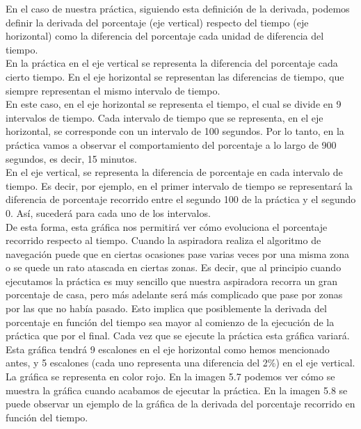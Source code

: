 En el caso de nuestra práctica, siguiendo esta definición de la derivada, podemos definir la derivada del porcentaje (eje vertical) respecto del tiempo (eje horizontal) como la diferencia del porcentaje cada unidad de diferencia del tiempo.\\

En la práctica en el eje vertical se representa la diferencia del porcentaje cada cierto tiempo. En el eje horizontal se representan las diferencias de tiempo, que siempre representan el mismo intervalo de tiempo. \\

En este caso, en el eje horizontal se representa el tiempo, el cual se divide en 9 intervalos de tiempo. Cada intervalo de tiempo que se representa, en el eje horizontal, se corresponde con un intervalo de 100 segundos. Por lo tanto, en la práctica vamos a observar el comportamiento del porcentaje a lo largo de 900 segundos, es decir, 15 minutos.\\

En el eje vertical, se representa la diferencia de porcentaje en cada intervalo de tiempo. Es decir, por ejemplo, en el primer intervalo de tiempo se representará la diferencia de porcentaje recorrido entre el segundo 100 de la práctica y el segundo 0. Así, sucederá para cada uno de los intervalos.\\

De esta forma, esta gráfica nos permitirá ver cómo evoluciona el porcentaje recorrido respecto al tiempo. Cuando la aspiradora realiza el algoritmo de navegación puede que en ciertas ocasiones pase varias veces por una misma zona o se quede un rato atascada en ciertas zonas. Es decir, que al principio cuando ejecutamos la práctica es muy sencillo que nuestra aspiradora recorra un gran porcentaje de casa, pero más adelante será más complicado que pase por zonas por las que no había pasado. Esto implica que posiblemente la derivada del porcentaje en función del tiempo sea mayor al comienzo de la ejecución de la práctica que por el final. Cada vez que se ejecute la práctica esta gráfica variará.\\

Esta gráfica tendrá 9 escalones en el eje horizontal como hemos mencionado antes, y 5 escalones (cada uno representa una diferencia del 2\%) en el eje vertical. La gráfica se representa en color rojo. En la imagen 5.7 podemos ver cómo se muestra la gráfica cuando acabamos de ejecutar la práctica. En la imagen 5.8 se puede observar un ejemplo de la gráfica de la derivada del porcentaje recorrido en función del tiempo.\\

